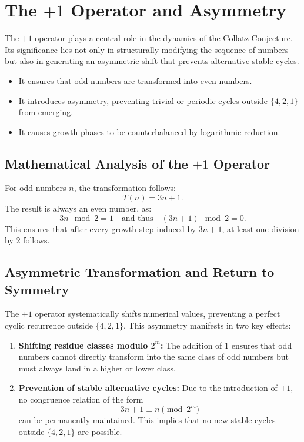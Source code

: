\documentclass[a4paper,12pt]{article}
\begin{document}
\section{The \(+1\) Operator and Asymmetry}
The \(+1\) operator plays a central role in the dynamics of the Collatz Conjecture. Its significance lies not only in structurally modifying the sequence of numbers but also in generating an asymmetric shift that prevents alternative stable cycles.

\begin{itemize}
    \item It ensures that odd numbers are transformed into even numbers.
    \item It introduces asymmetry, preventing trivial or periodic cycles outside \( \{4, 2, 1\} \) from emerging.
    \item It causes growth phases to be counterbalanced by logarithmic reduction.
\end{itemize}

\subsection{Mathematical Analysis of the \(+1\) Operator}
For odd numbers \( n \), the transformation follows:
\[
T(n) = 3n + 1.
\]
The result is always an even number, as:
\[
3n \mod 2 = 1 \quad \text{and thus} \quad (3n + 1) \mod 2 = 0.
\]
This ensures that after every growth step induced by \( 3n + 1 \), at least one division by 2 follows.

\subsection{Asymmetric Transformation and Return to Symmetry}
The \(+1\) operator systematically shifts numerical values, preventing a perfect cyclic recurrence outside \( \{4, 2, 1\} \). This asymmetry manifests in two key effects:

\begin{enumerate}
    \item \textbf{Shifting residue classes modulo \( 2^m \):}  
    The addition of 1 ensures that odd numbers cannot directly transform into the same class of odd numbers but must always land in a higher or lower class.
    \item \textbf{Prevention of stable alternative cycles:}  
    Due to the introduction of \( +1 \), no congruence relation of the form
    \[
    3n + 1 \equiv n \pmod{2^m}
    \]
    can be permanently maintained. This implies that no new stable cycles outside \( \{4,2,1\} \) are possible.
\end{enumerate}
\end{document}
